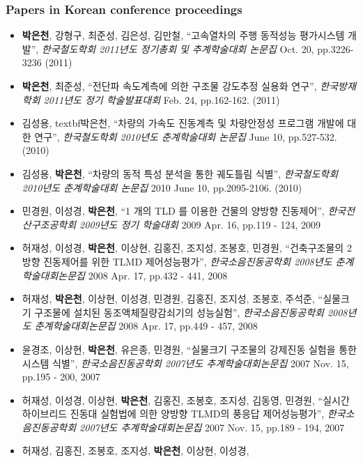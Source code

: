 \subsubsection*{Papers in Korean conference proceedings}
\begin{itemize}

\item[]
  \textbf{박은천}, 강형구, 최준성, 김은성, 김만철, ``고속열차의 주행
  동적성능 평가시스템 개발'', \emph{한국철도학회 2011년도 정기총회 및
  추계학술대회 논문집} Oct. 20, pp.3226-3236 (2011)
\item[]
  \textbf{박은천}, 최준성, ``전단파 속도계측에 의한 구조물 강도추정
  실용화 연구'', \emph{한국방재학회 2011년도 정기 학술발표대회} Feb. 24,
  pp.162-162. (2011)
\item[]
  김성용, textbf{박은천}, ``차량의 가속도 진동계측 및 차량안정성
  프로그램 개발에 대한 연구'', \emph{한국철도학회 2010년도 춘계학술대회
  논문집} June 10, pp.527-532. (2010)
\item[]
  김성용, \textbf{박은천}, ``차량의 동적 특성 분석을 통한 궤도틀림
  식별'', \emph{한국철도학회 2010년도 춘계학술대회 논문집} 2010 June 10,
  pp.2095-2106. (2010)
\item[]
  민경원, 이성경, \textbf{박은천}, ``1 개의 TLD 를 이용한 건물의 양방향
  진동제어'', \emph{한국전산구조공학회 2009년도 정기 학술대회} 2009 Apr.
  16, pp.119 - 124, 2009
\item[]
  허재성, 이성경, \textbf{박은천}, 이상현, 김홍진, 조지성, 조봉호,
  민경원, ``건축구조물의 2방향 진동제어를 위한 TLMD 제어성능평가'',
  \emph{한국소음진동공학회 2008년도 춘계학술대회논문집} 2008 Apr. 17,
  pp.432 - 441, 2008
\item[]
  허재성, \textbf{박은천}, 이상현, 이성경, 민경원, 김홍진, 조지성,
  조봉호, 주석준, ``실물크기 구조물에 설치된 동조액체질량감쇠기의
  성능실험'', \emph{한국소음진동공학회 2008년도 춘계학술대회논문집} 2008
  Apr. 17, pp.449 - 457, 2008
\item[]
  윤경조, 이상현, \textbf{박은천}, 유은종, 민경원, ``실물크기 구조물의
  강제진동 실험을 통한 시스템 식별'', \emph{한국소음진동공학회 2007년도
  추계학술대회논문집} 2007 Nov. 15, pp.195 - 200, 2007
\item[]
  허재성, 이성경, 이상현, \textbf{박은천}, 김홍진, 조봉호, 조지성,
  김동영, 민경원, ``실시간 하이브리드 진동대 실험법에 의한 양방향 TLMD의
  풍응답 제어성능평가'', \emph{한국소음진동공학회 2007년도
  추계학술대회논문집} 2007 Nov. 15, pp.189 - 194, 2007
\item[]
  허재성, 김홍진, 조봉호, 조지성, \textbf{박은천}, 이상현, 이성경,

\end{itemize}
